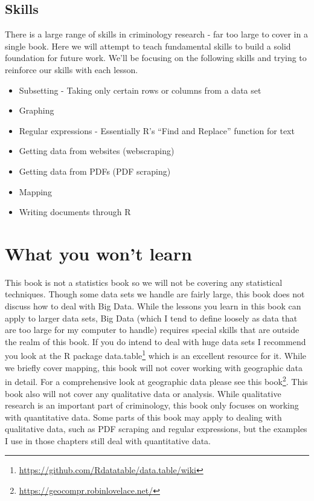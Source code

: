 \documentclass[
]{krantz}
\providecommand{\tightlist}{%
  \setlength{\itemsep}{0pt}\setlength{\parskip}{0pt}}
\renewcommand{\href}[2]{#2\footnote{\url{#1}}}
\begin{document}
\hypertarget{skills}{%
\subsection*{Skills}\label{skills}}


There is a large range of skills in criminology research -
far too large to cover in a single book. Here we will
attempt to teach fundamental skills to build a solid
foundation for future work. We'll be focusing on the
following skills and trying to reinforce our skills with
each lesson.

\begin{itemize}
\tightlist
\item
  Subsetting - Taking only certain rows or columns from a
  data set
\item
  Graphing
\item
  Regular expressions - Essentially R's ``Find and Replace''
  function for text
\item
  Getting data from websites (webscraping)
\item
  Getting data from PDFs (PDF scraping)
\item
  Mapping
\item
  Writing documents through R
\end{itemize}

\hypertarget{what-you-wont-learn}{%
\section*{What you won't learn}\label{what-you-wont-learn}}


This book is not a statistics book so we will not be
covering any statistical techniques. Though some data sets
we handle are fairly large, this book does not discuss how
to deal with Big Data. While the lessons you learn in this
book can apply to larger data sets, Big Data (which I tend
to define loosely as data that are too large for my computer
to handle) requires special skills that are outside the
realm of this book. If you do intend to deal with huge data
sets I recommend you look at the R package
\href{https://github.com/Rdatatable/data.table/wiki}{data.table}
which is an excellent resource for it. While we briefly
cover mapping, this book will not cover working with
geographic data in detail. For a comprehensive look at
geographic data please see this
\href{https://geocompr.robinlovelace.net/}{book}. This book
also will not cover any qualitative data or analysis. While
qualitative research is an important part of criminology,
this book only focuses on working with quantitative data.
Some parts of this book may apply to dealing with
qualitative data, such as PDF scraping and regular
expressions, but the examples I use in those chapters still
deal with quantitative data.
\end{document}
